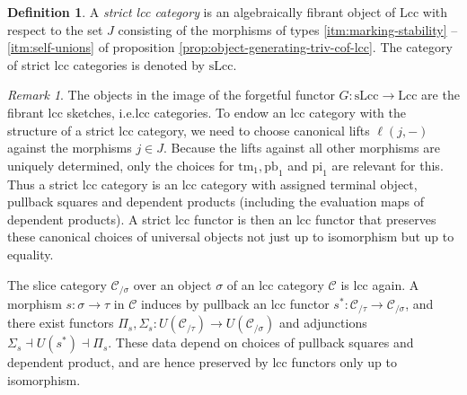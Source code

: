 \documentclass[a4paper]{article}
\theoremstyle{remark}
\newtheorem{remark}[theorem]{Remark}
\theoremstyle{definition}
\newtheorem{definition}[theorem]{Definition}
\begin{document}
\begin{definition}
  A \emph{strict lcc category} is an algebraically fibrant object of $\mathrm{Lcc}$ with respect to the set $J$ consisting of the morphisms of types \ref{itm:marking-stability} -- \ref{itm:self-unions} of proposition \ref{prop:object-generating-triv-cof-lcc}.
  The category of strict lcc categories is denoted by $\mathrm{sLcc}$.
\end{definition}

\begin{remark}
  The objects in the image of the forgetful functor $G : \mathrm{sLcc} \rightarrow \mathrm{Lcc}$ are the fibrant lcc sketches, i.e.\@ lcc categories.
  To endow an lcc category with the structure of a strict lcc category, we need to choose canonical lifts $\ell(j, -)$ against the morphisms $j \in J$.
  Because the lifts against all other morphisms are uniquely determined, only the choices for $\mathrm{tm}_1, \mathrm{pb}_1$ and $\mathrm{pi}_1$ are relevant for this.
  Thus a strict lcc category is an lcc category with assigned terminal object, pullback squares and dependent products (including the evaluation maps of dependent products).
  A strict lcc functor is then an lcc functor that preserves these canonical choices of universal objects not just up to isomorphism but up to equality.
\end{remark}

The slice category $\mathcal{C}_{/ \sigma}$ over an object $\sigma$ of an lcc category $\mathcal{C}$ is lcc again.
A morphism $s : \sigma \rightarrow \tau$ in $\mathcal{C}$ induces by pullback an lcc functor $s^* : \mathcal{C}_{/ \tau} \rightarrow \mathcal{C}_{/ \sigma}$, and there exist functors $\Pi_s, \Sigma_s : U(\mathcal{C}_{/ \tau}) \rightarrow U(\mathcal{C}_{/ \sigma})$ and adjunctions $\Sigma_s \dashv U(s^*) \dashv \Pi_s$.
These data depend on choices of pullback squares and dependent product, and are hence preserved by lcc functors only up to isomorphism.
\end{document}
